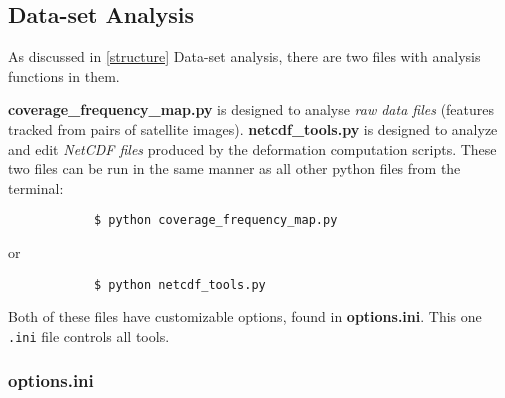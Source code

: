 \documentclass{article}
\begin{document}
    \subsection{Data-set Analysis}

        As discussed in \ref{structure} Data-set analysis, there are two files with analysis functions in them.

        \textbf{coverage\_frequency\_map.py} is designed to analyse \textit{raw data files} (features tracked from pairs of satellite images). \textbf{netcdf\_tools.py} is designed to analyze and edit \textit{NetCDF files} produced by the deformation computation scripts. These two files can be run in the same manner as all other python files from the terminal:
        \begin{verbatim}
            $ python coverage_frequency_map.py
        \end{verbatim}
        or
        \begin{verbatim}
            $ python netcdf_tools.py
        \end{verbatim}
        Both of these files have customizable options, found in \textbf{options.ini}. This one \verb?.ini? file controls all tools.

        \subsubsection{\textbf{options.ini}}
\end{document}
